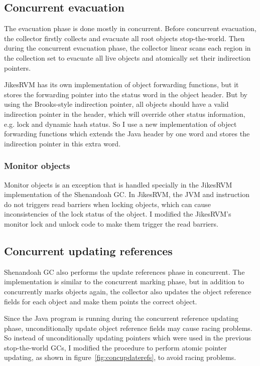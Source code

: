 \subsection{Concurrent evacuation}

The evacuation phase is done mostly in concurrent. Before concurrent evacuation,
the collector firstly collects and evacuate all root objects stop-the-world.
Then during the concurrent evacuation phase, the collector linear scans each region in the
collection set to evacuate all live objects and atomically set their indirection
pointers.

JikesRVM has its own implementation of object forwarding functions, but it stores the forwarding
pointer into the status word in the object header. But by using the Brooks-style indirection
pointer, all objects should have a valid indirection pointer in the header, which will override other status
information, e.g. lock and dynamic hash status. So I use a new implementation of
object forwarding functions which extends the Java header by one word and stores the indirection
pointer in this extra word.

\subsubsection{Monitor objects}

Monitor objects is an exception that is handled specially in the JikesRVM implementation of the Shenandoah GC.
In JikesRVM, the JVM  and  instruction
do not triggers read barriers when locking objects, which can cause inconsistencies 
of the lock status of the object. I modified the JikesRVM's monitor lock and unlock
code to make them trigger the read barriers.

\subsection{Concurrent updating references}

Shenandoah GC also performs the update references phase in concurrent.
The implementation is similar to the concurrent marking phase, but in addition to
concurrently marks objects again, the collector also updates the object reference fields
for each object and make them points the correct object.

Since the Java program is running during the concurrent reference updating phase,
unconditionally update object reference fields may cause racing problems. So instead of
unconditionally updating pointers which were used in the previous stop-the-world GCs,
I modified the procedure to perform
atomic pointer updating, as shown in figure~\ref{fig:concupdaterefs},
to avoid racing problems.

